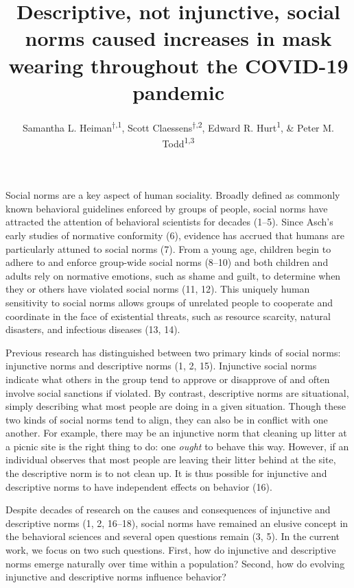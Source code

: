 \documentclass[
  man,floatsintext]{apa6}
\title{Descriptive, not injunctive, social norms caused increases in mask wearing throughout the COVID-19 pandemic}
\author{Samantha L. Heiman\textsuperscript{$\dagger{}$,1}, Scott Claessens\textsuperscript{$\dagger{}$,2}, Edward R. Hurt\textsuperscript{1}, \& Peter M. Todd\textsuperscript{1,3}}
\date{}
\affiliation{\vspace{0.5cm}\textsuperscript{1} Department of Psychological and Brain Sciences, Indiana University Bloomington, United States\\\textsuperscript{2} School of Psychology, University of Auckland, New Zealand\\\textsuperscript{3} Cognitive Science Program, Indiana University Bloomington, United States}
\begin{document}
\maketitle

Social norms are a key aspect of human sociality. Broadly defined as commonly known behavioral guidelines enforced by groups of people, social norms have attracted the attention of behavioral scientists for decades (1--5). Since Asch's early studies of normative conformity (6), evidence has accrued that humans are particularly attuned to social norms (7). From a young age, children begin to adhere to and enforce group-wide social norms (8--10) and both children and adults rely on normative emotions, such as shame and guilt, to determine when they or others have violated social norms (11, 12). This uniquely human sensitivity to social norms allows groups of unrelated people to cooperate and coordinate in the face of existential threats, such as resource scarcity, natural disasters, and infectious diseases (13, 14).

Previous research has distinguished between two primary kinds of social norms: injunctive norms and descriptive norms (1, 2, 15). Injunctive social norms indicate what others in the group tend to approve or disapprove of and often involve social sanctions if violated. By contrast, descriptive norms are situational, simply describing what most people are doing in a given situation. Though these two kinds of social norms tend to align, they can also be in conflict with one another. For example, there may be an injunctive norm that cleaning up litter at a picnic site is the right thing to do: one \emph{ought} to behave this way. However, if an individual observes that most people are leaving their litter behind at the site, the descriptive norm is to not clean up. It is thus possible for injunctive and descriptive norms to have independent effects on behavior (16).

Despite decades of research on the causes and consequences of injunctive and descriptive norms (1, 2, 16--18), social norms have remained an elusive concept in the behavioral sciences and several open questions remain (3, 5). In the current work, we focus on two such questions. First, how do injunctive and descriptive norms emerge naturally over time within a population? Second, how do evolving injunctive and descriptive norms influence behavior?
\end{document}
